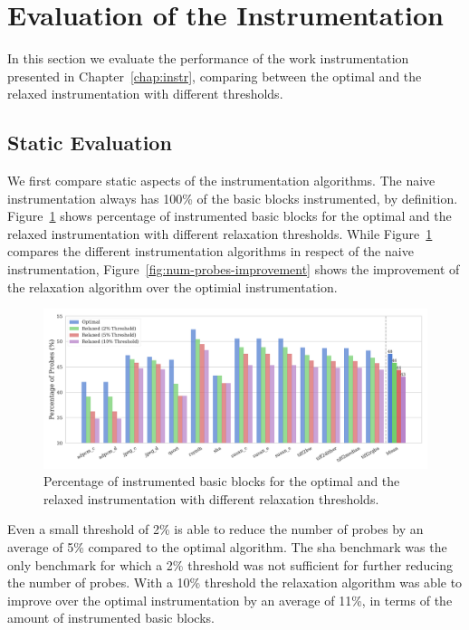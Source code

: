 \section{Evaluation of the Instrumentation}

In this section we evaluate the performance of the work instrumentation presented in Chapter~\ref{chap:instr}, comparing between the optimal and the relaxed instrumentation with different thresholds.

\subsection{Static Evaluation}

We first compare static aspects of the instrumentation algorithms.
The naive instrumentation always has 100\% of the basic blocks instrumented, by definition.
Figure~\ref{fig:num-probes} shows percentage of instrumented basic blocks for the optimal and the relaxed instrumentation with different relaxation thresholds.
While Figure~\ref{fig:num-probes} compares the different instrumentation algorithms in respect of the naive instrumentation, Figure~\ref{fig:num-probes-improvement} shows the improvement of the relaxation algorithm over the optimial instrumentation.

\begin{figure}[ht]
    \centering
    \includegraphics[width=\textwidth]{figs/num-probes.pdf}
    \caption{Percentage of instrumented basic blocks for the optimal and the relaxed instrumentation with different relaxation thresholds.}
    \label{fig:num-probes}
\end{figure}

Even a small threshold of 2\% is able to reduce the number of probes by an average of 5\% compared to the optimal algorithm. 
The {\flagstype sha} benchmark was the only benchmark for which a 2\% threshold was not sufficient for further reducing the number of probes.
With a 10\% threshold the relaxation algorithm was able to improve over the optimal instrumentation by an average of 11\%, in terms of the amount of instrumented basic blocks.


